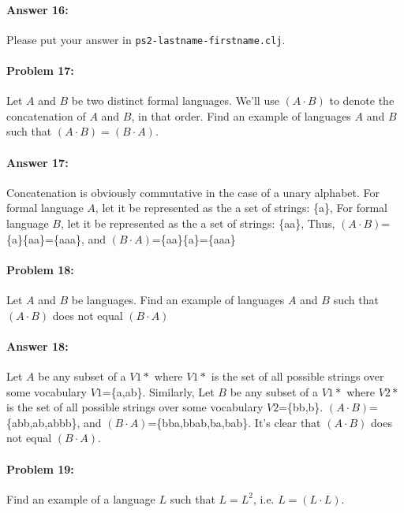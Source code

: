 \documentclass[10pt]{article}
\newcommand{\PSnum}{2}
\begin{document}
\paragraph{Answer 16:} Please put your answer in
\texttt{ps\PSnum-lastname-firstname.clj}.

\noindent\hrulefill %

\paragraph{Problem 17:}
Let $A$ and $B$ be two distinct formal languages. We'll use
$(A\cdot B)$ to denote the concatenation of $A$ and $B$, in
that order. Find an example of languages $A$ and $B$ such that
$(A\cdot B)=(B\cdot A)$.

\paragraph{Answer 17:} 
Concatenation is obviously commutative in the case of a unary alphabet.
For formal language $A$, let it be represented as the a set of strings: \{a\}, 
For formal language $B$, let it be represented as the a set of strings: \{aa\},
Thus, $(A\cdot B)$=\{a\}\{aa\}=\{aaa\}, and $(B\cdot A)$=\{aa\}\{a\}=\{aaa\}

\noindent\hrulefill %

\paragraph{Problem 18:}
Let $A$ and $B$ be languages. Find an example of languages $A$ and $B$
such that $(A\cdot B)$ does not equal $(B\cdot A)$

\paragraph{Answer 18:} Let $A$ be any subset of a $V1*$ where $V1*$ is the set of all possible strings over some vocabulary 
$V1$=\{a,ab\}. Similarly, Let $B$ be any subset of a $V1*$ where $V2*$ is the set of all possible strings over some vocabulary 
$V2$=\{bb,b\}. $(A\cdot B)$=\{abb,ab,abbb\}, and $(B\cdot A)$=\{bba,bbab,ba,bab\}. It's clear that $(A\cdot B)$ does not equal $(B\cdot A)$.


\noindent\hrulefill %

\paragraph{Problem 19:}
Find an example of a language $L$ such that $L=L^2$,
i.e. $L=(L\cdot L)$.
\end{document}
